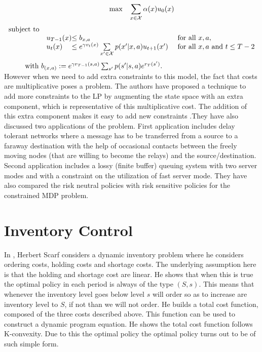 \documentclass[11pt,a4paper,oneside]{report}
\begin{document}
\begin{equation}
\hspace{1cm}\text{max    }   \hspace{0.2cm}\sum\limits_{x\in\cal{X}}\alpha(x)u_0(x)
\end{equation}
\begin{equation*}
\begin{array}{ll@{}ll}
\text{subject to}& \\
&u_{T-1}(x)&\leq b_{x,a}                                                             &\text{ for all } x,a,\\
&u_t(x)&\leq e^{\gamma v_t(x)}\sum\limits_{x'\in \cal{X}} p(x'|x,a)u_{t+1}(x')   &\text{ for all } x,a \text{ and } t\leq T-2
\end{array}
\end{equation*}
$\hspace{0.9cm}\text{ with } b_{(x,a)}:= e^{\gamma r_{T-1}(s,a)}\sum_{s'} p(s'|s,a)e^{r_T(s')}.$\\
However when we need to add extra constraints to this model, the fact that costs are multiplicative poses a problem. The authors have proposed a technique to add more constraints to the LP by augmenting the state space with an extra component, which is representative of this multiplicative cost. The addition of this extra component makes it easy to add new constraints .They have also discussed two applications of the problem. First application includes delay tolerant networks where a message has to be transferred from a source to a faraway destination with the help of occasional contacts between the freely moving nodes (that are willing to become the relays) and the source/destination. Second application includes a lossy (finite buffer) queuing system with two server modes and with a constraint on the utilization of fast server mode. They have also compared the risk neutral policies with risk sensitive policies for the constrained MDP problem.\\

\section{Inventory Control}
In \cite{scarf1959optimality}, Herbert Scarf considers a dynamic inventory problem where he considers ordering costs, holding costs and shortage costs. The underlying assumption here is that the holding and shortage cost are linear. He shows that when this is true the optimal policy in each period is always of the type $(S,s)$. This means that whenever the inventory level goes below level $s$ will order so as to increase are inventory level to $S$, if not than we will not order. He builds a total cost function, composed of the three costs described above. This function can be used to construct a dynamic program equation. He shows the total cost function follows K-convexity. Due to this the optimal policy the optimal policy turns out to be of such simple form.\\
\end{document}
